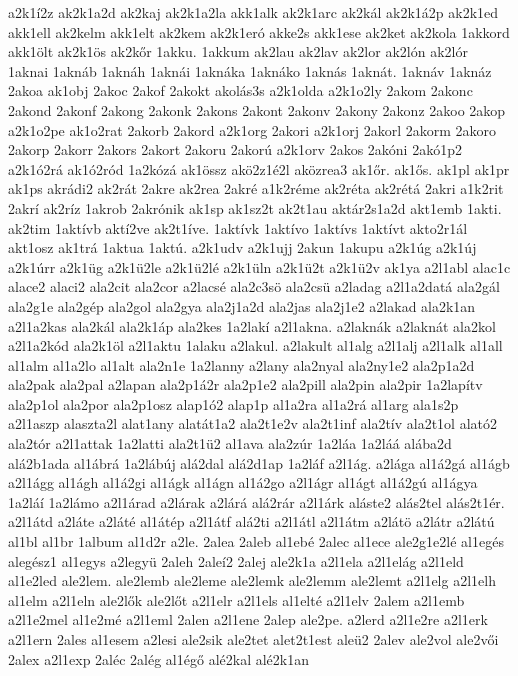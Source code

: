 {a2k1í2z
ak2k1a2d
ak2kaj
ak2k1a2la
akk1alk
ak2k1arc
ak2kál
ak2k1á2p
ak2k1ed
akk1ell
ak2kelm
akk1elt
ak2kem
ak2k1eró
akke2s
akk1ese
ak2ket
ak2kola
1akkord
akk1ölt
ak2k1ös
ak2kőr
1akku.
1akkum
ak2lau
ak2lav
ak2lor
ak2lón
ak2lór
1aknai
1aknáb
1aknáh
1aknái
1aknáka
1aknáko
1aknás
1aknát.
1aknáv
1aknáz
2akoa
ak1obj
2akoc
2akof
2akokt
akolás3s
a2k1olda
a2k1o2ly
2akom
2akonc
2akond
2akonf
2akong
2akonk
2akons
2akont
2akonv
2akony
2akonz
2akoo
2akop
a2k1o2pe
ak1o2rat
2akorb
2akord
a2k1org
2akori
a2k1orj
2akorl
2akorm
2akoro
2akorp
2akorr
2akors
2akort
2akoru
2akorú
a2k1orv
2akos
2akóni
2akó1p2
a2k1ó2rá
ak1ó2ród
1a2kózá
ak1össz
akö2z1é2l
aközrea3
ak1őr.
ak1ős.
ak1pl
ak1pr
ak1ps
akrádi2
ak2rát
2akre
ak2rea
2akré
a1k2réme
ak2réta
ak2rétá
2akri
a1k2rit
2akrí
ak2ríz
1akrob
2akrónik
ak1sp
ak1sz2t
ak2t1au
aktár2s1a2d
akt1emb
1akti.
ak2tim
1aktívb
aktí2ve
ak2t1íve.
1aktívk
1aktívo
1aktívs
1aktívt
akto2r1ál
akt1osz
ak1trá
1aktua
1aktú.
a2k1udv
a2k1ujj
2akun
1akupu
a2k1úg
a2k1új
a2k1úrr
a2k1üg
a2k1ü2le
a2k1ü2lé
a2k1üln
a2k1ü2t
a2k1ü2v
ak1ya
a2l1abl
alac1c
alace2
alaci2
ala2cit
ala2cor
a2lacsé
ala2c3sö
ala2csü
a2ladag
a2l1a2datá
ala2gál
ala2g1e
ala2gép
ala2gol
ala2gya
ala2j1a2d
ala2jas
ala2j1e2
a2lakad
ala2k1an
a2l1a2kas
ala2kál
ala2k1áp
ala2kes
1a2lakí
a2l1akna.
a2laknák
a2laknát
ala2kol
a2l1a2kód
ala2k1öl
a2l1aktu
1alaku
a2lakul.
a2lakult
al1alg
a2l1alj
a2l1alk
al1all
al1alm
al1a2lo
al1alt
ala2n1e
1a2lanny
a2lany
ala2nyal
ala2ny1e2
ala2p1a2d
ala2pak
ala2pal
a2lapan
ala2p1á2r
ala2p1e2
ala2pill
ala2pin
ala2pir
1a2lapítv
ala2p1ol
ala2por
ala2p1osz
alap1ó2
alap1p
al1a2ra
al1a2rá
al1arg
ala1s2p
a2l1aszp
alaszta2l
alat1any
alatát1a2
ala2t1e2v
ala2t1inf
ala2tív
ala2t1ol
alató2
ala2tór
a2l1attak
1a2latti
ala2t1ü2
al1ava
ala2zúr
1a2láa
1a2láá
alába2d
alá2b1ada
al1ábrá
1a2lábúj
alá2dal
alá2d1ap
1a2láf
a2l1ág.
a2lága
al1á2gá
al1ágb
a2l1ágg
al1ágh
al1á2gi
al1ágk
al1ágn
al1á2go
a2l1ágr
al1ágt
al1á2gú
al1ágya
1a2láí
1a2lámo
a2l1árad
a2lárak
a2lárá
alá2rár
a2l1árk
aláste2
alás2tel
alás2t1ér.
a2l1átd
a2láte
a2láté
al1átép
a2l1átf
alá2ti
a2l1átl
a2l1átm
a2látö
a2látr
a2látú
al1bl
al1br
1album
al1d2r
a2le.
2alea
2aleb
al1ebé
2alec
al1ece
ale2g1e2lé
al1egés
alegész1
al1egys
a2legyü
2aleh
2aleí2
2alej
ale2k1a
a2l1ela
a2l1elág
a2l1eld
al1e2led
ale2lem.
ale2lemb
ale2leme
ale2lemk
ale2lemm
ale2lemt
a2l1elg
a2l1elh
al1elm
a2l1eln
ale2lők
ale2lőt
a2l1elr
a2l1els
al1elté
a2l1elv
2alem
a2l1emb
a2l1e2mel
al1e2mé
a2l1eml
2alen
a2l1ene
2alep
ale2pe.
a2lerd
a2l1e2re
a2l1erk
a2l1ern
2ales
al1esem
a2lesi
ale2sik
ale2tet
alet2t1est
aleü2
2alev
ale2vol
ale2vői
2alex
a2l1exp
2aléc
2alég
al1égő
alé2kal
alé2k1an
}
